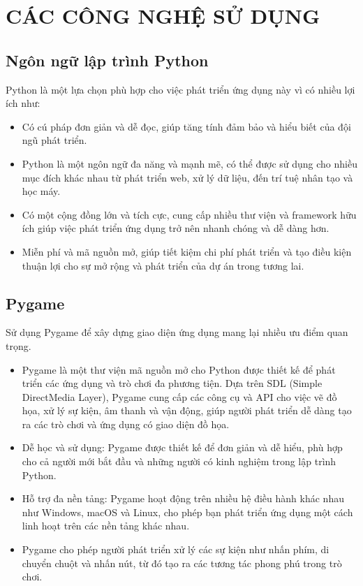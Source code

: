 \documentclass[a4paper]{article}
\begin{document}
\newpage
\section{CÁC CÔNG NGHỆ SỬ DỤNG}

\subsection{Ngôn ngữ lập trình Python}
    Python là một lựa chọn phù hợp cho việc phát triển ứng dụng này vì có nhiều lợi ích như:
\begin{itemize}
    \item Có cú pháp đơn giản và dễ đọc, giúp tăng tính đảm bảo và hiểu biết của đội ngũ phát triển.
    \item Python là một ngôn ngữ đa năng và mạnh mẽ, có thể được sử dụng cho nhiều mục đích khác nhau từ phát triển web, xử lý dữ liệu, đến trí tuệ nhân tạo và học máy.
    \item Có một cộng đồng lớn và tích cực, cung cấp nhiều thư viện và framework hữu ích giúp việc phát triển ứng dụng trở nên nhanh chóng và dễ dàng hơn.
    \item Miễn phí và mã nguồn mở, giúp tiết kiệm chi phí phát triển và tạo điều kiện thuận lợi cho sự mở rộng và phát triển của dự án trong tương lai.
\end{itemize}

\subsection{Pygame}
Sử dụng Pygame để xây dựng giao diện ứng dụng mang lại nhiều ưu điểm quan trọng.
\begin{itemize}
    \item Pygame là một thư viện mã nguồn mở cho Python được thiết kế để phát triển các ứng dụng và trò chơi đa phương tiện. Dựa trên SDL (Simple DirectMedia Layer), Pygame cung cấp các công cụ và API cho việc vẽ đồ họa, xử lý sự kiện, âm thanh và vận động, giúp người phát triển dễ dàng tạo ra các trò chơi và ứng dụng có giao diện đồ họa.
    \item Dễ học và sử dụng: Pygame được thiết kế để đơn giản và dễ hiểu, phù hợp cho cả người mới bắt đầu và những người có kinh nghiệm trong lập trình Python.
    \item Hỗ trợ đa nền tảng: Pygame hoạt động trên nhiều hệ điều hành khác nhau như Windows, macOS và Linux, cho phép bạn phát triển ứng dụng một cách linh hoạt trên các nền tảng khác nhau.
    \item Pygame cho phép người phát triển xử lý các sự kiện như nhấn phím, di chuyển chuột và nhấn nút, từ đó tạo ra các tương tác phong phú trong trò chơi.
\end{itemize}
\end{document}
